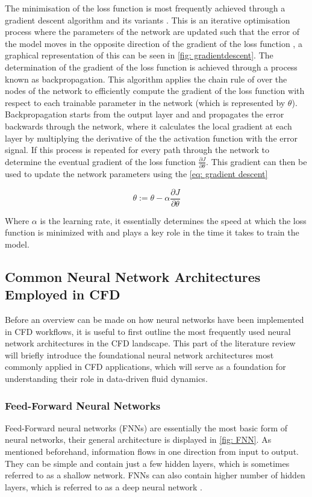 The minimisation of the loss function is most frequently achieved through a gradient descent algorithm and its variants \cite{Aggarwal2018}. This is an iterative optimisation process where the parameters of the network are updated such that the error of the model moves in the opposite direction of the gradient of the loss function \cite{Aggarwal2018}, a graphical representation of this can be seen in \autoref{fig: gradientdescent}. The determination of the gradient of the loss function is achieved through a process known as backpropagation. This algorithm applies the chain rule of over the nodes of the network to efficiently compute the gradient of the loss function with respect to each trainable parameter in the network (which is represented by $\theta$). Backpropagation starts from the output layer and and propagates the error backwards through the network, where it calculates the local gradient at each layer by multiplying the derivative of the the activation function with the error signal. If this process is repeated for every path through the network to determine the eventual gradient of the loss function $\frac{\partial J}{\partial \theta}$. This gradient can then be used to update the network parameters using the \autoref{eq: gradient descent}


\begin{equation}\label{eq: gradient descent}
    \theta := \theta -\alpha \frac{\partial J}{\partial \theta}
\end{equation}

Where $\alpha$ is the learning rate, it essentially determines the speed at which the loss function is minimized with and plays a key role in the time it takes to train the model. 

\subsection{Common Neural Network Architectures Employed in CFD}
\label{subsect: commonNN}
Before an overview can be made on how neural networks have been implemented in CFD workflows, it is useful to first outline the most frequently used neural network architectures in the CFD landscape. This part of the literature review will briefly introduce the foundational neural network architectures most commonly applied in CFD applications, which will serve as a foundation for understanding their role in data-driven fluid dynamics. 

\subsubsection{Feed-Forward Neural Networks}
Feed-Forward neural networks (FNNs) are essentially the most basic form of neural networks, their general architecture is displayed in \autoref{fig: FNN}. As mentioned beforehand, information flows in one direction from input to output. They can be simple and contain just a few hidden layers, which is sometimes referred to as a shallow network. FNNs can also contain higher number of hidden layers, which is referred to as a deep neural network \cite{Aggarwal2018}. 

